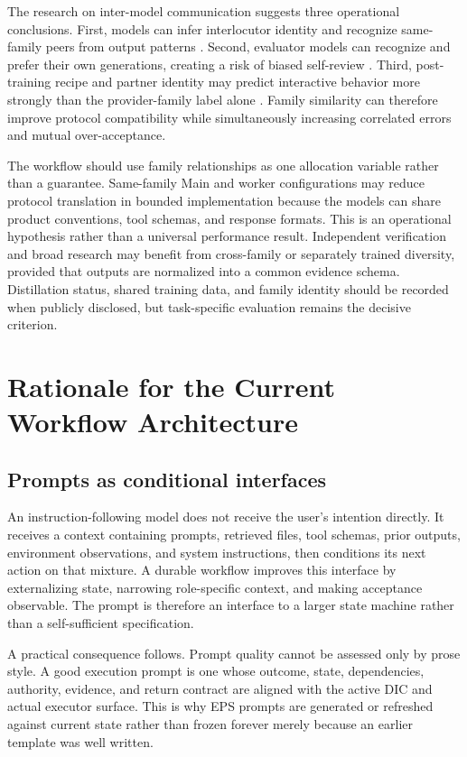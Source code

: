 \documentclass[11pt,a4paper]{article}
\begin{document}
The research on inter-model communication suggests three operational conclusions. First, models can infer interlocutor identity and recognize same-family peers from output patterns \cite{choi2025interlocutor}. Second, evaluator models can recognize and prefer their own generations, creating a risk of biased self-review \cite{panickssery2024}. Third, post-training recipe and partner identity may predict interactive behavior more strongly than the provider-family label alone \cite{zhang2026posttraining}. Family similarity can therefore improve protocol compatibility while simultaneously increasing correlated errors and mutual over-acceptance.

The workflow should use family relationships as one allocation variable rather than a guarantee. Same-family Main and worker configurations may reduce protocol translation in bounded implementation because the models can share product conventions, tool schemas, and response formats. This is an operational hypothesis rather than a universal performance result. Independent verification and broad research may benefit from cross-family or separately trained diversity, provided that outputs are normalized into a common evidence schema. Distillation status, shared training data, and family identity should be recorded when publicly disclosed, but task-specific evaluation remains the decisive criterion.



\section{Rationale for the Current Workflow Architecture}\label{sec:rationale}

\subsection{Prompts as conditional interfaces}\label{sec:conditional-interface}
An instruction-following model does not receive the user's intention directly. It receives a context containing prompts, retrieved files, tool schemas, prior outputs, environment observations, and system instructions, then conditions its next action on that mixture. A durable workflow improves this interface by externalizing state, narrowing role-specific context, and making acceptance observable. The prompt is therefore an interface to a larger state machine rather than a self-sufficient specification.

A practical consequence follows. Prompt quality cannot be assessed only by prose style. A good execution prompt is one whose outcome, state, dependencies, authority, evidence, and return contract are aligned with the active DIC and actual executor surface. This is why EPS prompts are generated or refreshed against current state rather than frozen forever merely because an earlier template was well written.
\end{document}
